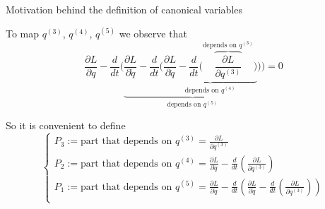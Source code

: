 \begin{frame}{Motivation behind the definition of canonical variables}
  \begin{alertblock}{}
    To map $q^{(3)}$, $q^{(4)}$, $q^{(5)}$ we observe that
    \begin{equation*} \label{eq:third_order_euler_lagrangian_h_with_parts}
      \frac{\partial L}{\partial q} -
      \frac{d}{dt} \biggl(
      \underbrace{
      \frac{\partial L}{\partial \dot{q}} -
      \frac{d}{dt} \biggl(
      \underbrace{
      \frac{\partial L}{\partial \ddot{q}} -
      \frac{d}{dt} \biggl(
      \overbrace{
      \frac{\partial L}{\partial q^{(3)}}
      }^{\text{depends on } q^{(3)}} \biggr)
      }_{\text{depends on } q^{(4)}} \biggr)
      }_{\text{depends on } q^{(5)}} \biggr)
      = 0
    \end{equation*}

    So it is convenient to define
    \begin{equation*}\label{eq:def_P}
      \begin{cases}
        P_3 := \text{part that depends on } q^{(3)}
             = \frac{\partial L}{\partial q^{(3)}} \\
        P_2 := \text{part that depends on } q^{(4)}
             = \frac{\partial L}{\partial \ddot{q}} -
               \frac{d}{dt} \left(
                 \frac{\partial L}{\partial q^{(3)}}
               \right) \\
        P_1 := \text{part that depends on } q^{(5)}
             = \frac{\partial L}{\partial \dot{q}} -
               \frac{d}{dt} \left(
                 \frac{\partial L}{\partial \ddot{q}} -
                 \frac{d}{dt} \left(
                   \frac{\partial L}{\partial q^{(3)}}
                  \right)
                \right) \\
      \end{cases}
    \end{equation*}
  \end{alertblock}
\end{frame}

